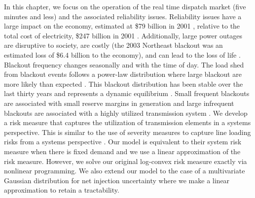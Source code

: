In this chapter, we focus on the operation of the real time dispatch market (five minutes and less) and the associated reliability issues.  Reliability issues have a large impact on the economy, estimated at \$79 billion in 2001 \cite{lacommare_2006}, relative to the total cost of electricity, \$247 billion in 2001 \cite{eia_gov}.  Additionally, large power outages are disruptive to society, are costly (the 2003 Northeast blackout was an estimated loss of \$6.4 billion to the economy), and can lead to the loss of life \cite{northeast_2003}.  Blackout frequency changes seasonally and with the time of day.  The load shed from blackout events follows a power-law distribution where large blackout are more likely than expected \cite{hines_2009}.  This blackout distribution has been stable over the last thirty years and represents a dynamic equilibrium \cite{dobson_2007,hines_2009}.  Small frequent blackouts are associated with small reserve margins in generation and large infrequent blackouts are associated with a highly utilized transmission system \cite{dobson_2007}.  We develop a risk measure that captures the utilization of transmission elements in a systems perspective.  This is similar to the use of severity measures to capture line loading risks from a systems perspective \cite{vrakopoulou_2013c,wang_2014,wang_2013}.  Our model is equivalent to their system risk measure when there is fixed demand and we use a linear approximation of the risk measure.  However, we solve our original log-convex risk measure exactly via nonlinear programming. We also extend our model to the case of a multivariate Gaussian distribution for net injection uncertainty where we make a linear approximation to retain a tractability.


